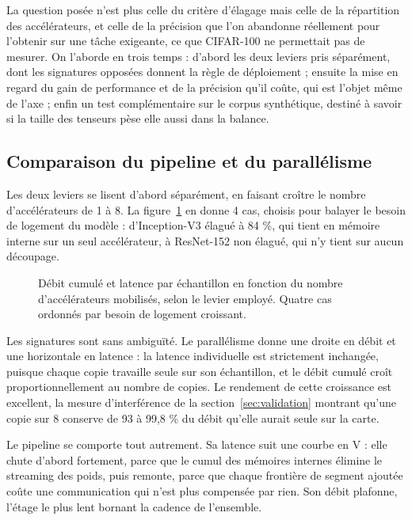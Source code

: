 \documentclass[11pt,a4paper]{report}
\begin{document}
La question posée n'est plus celle du critère d'élagage mais celle de la répartition des accélérateurs, et celle de la précision que l'on abandonne réellement pour l'obtenir sur une tâche exigeante, ce que CIFAR-100 ne permettait pas de mesurer. On l'aborde en trois temps : d'abord les deux leviers pris séparément, dont les signatures opposées donnent la règle de déploiement ; ensuite la mise en regard du gain de performance et de la précision qu'il coûte, qui est l'objet même de l'axe ; enfin un test complémentaire sur le corpus synthétique, destiné à savoir si la taille des tenseurs pèse elle aussi dans la balance.

\subsection{Comparaison du pipeline et du parallélisme}

Les deux leviers se lisent d'abord séparément, en faisant croître le nombre d'accélérateurs de 1 à 8. La figure~\ref{fig:pipe_vs_par} en donne 4 cas, choisis pour balayer le besoin de logement du modèle : d'Inception-V3 élagué à 84 \%, qui tient en mémoire interne sur un seul accélérateur, à ResNet-152 non élagué, qui n'y tient sur aucun découpage.

\begin{figure}[H]
    \centering
    
    \caption[Pipeline contre parallélisme]{Débit cumulé et latence par échantillon en fonction du nombre d'accélérateurs mobilisés, selon le levier employé. Quatre cas ordonnés par besoin de logement croissant.}
    \label{fig:pipe_vs_par}
\end{figure}

Les signatures sont sans ambiguïté. Le parallélisme donne une droite en débit et une horizontale en latence : la latence individuelle est strictement inchangée, puisque chaque copie travaille seule sur son échantillon, et le débit cumulé croît proportionnellement au nombre de copies. Le rendement de cette croissance est excellent, la mesure d'interférence de la section~\ref{sec:validation} montrant qu'une copie sur 8 conserve de 93 à 99,8 \% du débit qu'elle aurait seule sur la carte.

Le pipeline se comporte tout autrement. Sa latence suit une courbe en V : elle chute d'abord fortement, parce que le cumul des mémoires internes élimine le streaming des poids, puis remonte, parce que chaque frontière de segment ajoutée coûte une communication qui n'est plus compensée par rien. Son débit plafonne, l'étage le plus lent bornant la cadence de l'ensemble.
\end{document}
